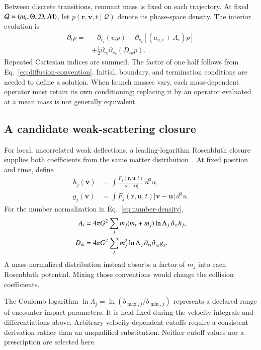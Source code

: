 \documentclass[aps,prd,reprint,amsmath,amssymb,superscriptaddress,nofootinbib,longbibliography,floatfix]{revtex4-2}
\begin{document}
Between discrete transitions, remnant mass is fixed on each trajectory. At fixed
$\mathcal Q=(m_{\rm r},\Theta,\mathcal D,\mathcal M)$,
let $p(\mathbf r,\mathbf v,t\mid\mathcal Q)$ denote its phase-space density. The interior evolution is
\begin{align}
\partial_t p={}&-\partial_{r_i}(v_i p)
-\partial_{v_i}[(a_{g,i}+A_i)p]\nonumber\\
&+\frac12\partial_{v_i}\partial_{v_k}(D_{ik}p).
\label{eq:fokker-planck}
\end{align}
Repeated Cartesian indices are summed. The factor of one half follows from Eq.~\eqref{eq:diffusion-convention}. Initial, boundary, and termination conditions are needed to define a solution. When launch masses vary, each mass-dependent operator must retain its own conditioning; replacing it by an operator evaluated at a mean mass is not generally equivalent.

\subsection{A candidate weak-scattering closure}

For local, uncorrelated weak deflections, a leading-logarithm Rosenbluth closure supplies both coefficients from the same matter distribution~\cite{Rosenbluth1957,Tep2022}. At fixed position and time, define
\begin{align}
h_j(\mathbf v)&=\int
\frac{F_j(\mathbf r,\mathbf u,t)}{|\mathbf v-\mathbf u|}\,d^3u,
\label{eq:rosenbluth-h}\\
g_j(\mathbf v)&=\int
F_j(\mathbf r,\mathbf u,t)|\mathbf v-\mathbf u|\,d^3u.
\label{eq:rosenbluth-g}
\end{align}
For the number normalization in Eq.~\eqref{eq:number-density},
\begin{align}
A_i&=4\pi G^2\sum_j
m_j(m_{\rm r}+m_j)\ln\Lambda_j\,
\partial_{v_i}h_j,
\label{eq:rosenbluth-drift}\\
D_{ik}&=4\pi G^2\sum_j
m_j^2\ln\Lambda_j\,
\partial_{v_i}\partial_{v_k}g_j.
\label{eq:rosenbluth-diffusion}
\end{align}
A mass-normalized distribution instead absorbs a factor of $m_j$ into each Rosenbluth potential. Mixing those conventions would change the collision coefficients.

The Coulomb logarithm
$\ln\Lambda_j=\ln(b_{\max,j}/b_{\min,j})$
represents a declared range of encounter impact parameters. It is held fixed during the velocity integrals and differentiations above. Arbitrary velocity-dependent cutoffs require a consistent derivation rather than an unqualified substitution. Neither cutoff values nor a prescription are selected here.
\end{document}
